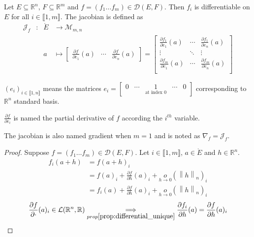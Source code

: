 \documentclass[11pt,en]{elegantpaper}
\newcommand\norm[1]{\left\lVert#1\right\rVert}
\begin{document}
\begin{definition}
  Let $E \subseteq \mathbb{R}^n$, $F \subseteq \mathbb{R}^m$ and $f = (f_1 \ldots f_m) \in \mathcal{D}(E,F)$.
  Then $f_i$ is differentiable on $E$ for all $i \in \llbracket 1,m \rrbracket$. The jacobian is defined as \begin{equation}
    \begin{array}{llll}
      \mathcal{J}_f & : & \mathring{E} & \longrightarrow \mathcal{M}_{m,n} \\
        &   & a & \longmapsto \begin{bmatrix}
        \frac{\partial f}{\partial e_1}(a) & \cdots & \frac{\partial f}{\partial e_n}(a)
      \end{bmatrix} = \begin{bmatrix}
        \frac{\partial f_1}{\partial e_1}(a) & \cdots & \frac{\partial f_1}{\partial e_n}(a) \\
        \vdots & \ddots & \vdots \\
        \frac{\partial f_m}{\partial e_1}(a) & \cdots & \frac{\partial f_m}{\partial e_n}(a) \\
      \end{bmatrix}
    \end{array}
  \end{equation}

  $(e_i)_{i \in \llbracket 1,n \rrbracket}$ means the matrices $e_i = \begin{bmatrix}
    0 & \cdots & \underset{\text{at index 0}} 1 & \cdots & 0
  \end{bmatrix}$ corresponding to $\mathbb{R}^n$ standard basis. \par
  $\frac{\partial f}{\partial e_i}$ is named the partial derivative of $f$ according the $i^{th}$ variable. \par
  The jacobian is also named gradient when $m=1$ and is noted as $\nabla_f = \mathcal{J}_f$.
\end{definition}

\begin{proof}
  Suppose $f = (f_1 \ldots f_m) \in \mathcal{D}(E,F)$. Let $i \in \llbracket 1,m \rrbracket$, $a \in \mathring{E}$ and $h \in \mathbb{R}^n$.
  \begin{equation*}
    \begin{split}
      f_i (a + h) & = f(a + h)_i \\
      & = f(a)_i + \frac{\partial f}{\partial h}(a)_i + \underset{h \to 0}o(\norm h _n)_i \\
      & = f_i(a) + \frac{\partial f}{\partial h}(a)_i + \underset{h \to 0}o(\norm h _n)_i
    \end{split}
  \end{equation*}
  \begin{equation*}
    \frac{\partial f}{\partial \cdot}(a)_i \in \mathcal{L}(\mathbb{R}^n,\mathbb{R}) \underset{prop\ref{prop:differential_unique}}\implies \frac{\partial f_i}{\partial h}(a) = \frac{\partial f}{\partial h}(a)_i
  \end{equation*}
\end{proof}
\end{document}
